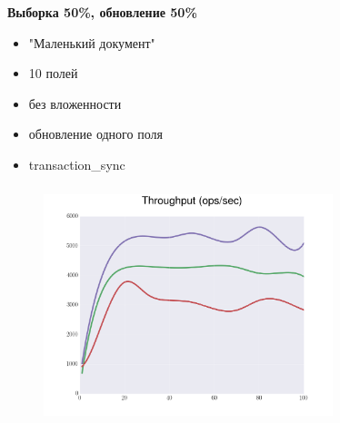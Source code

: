 \documentclass[18pt, compress, aspectratio=169]{beamer}
\begin{document}
\begin{frame}
    \frametitle{}
    \begin{center}
        \textbf{Выборка 50\%, обновление 50\%}
        \begin{itemize}[label={}]
            \item "Маленький документ"
            \item 10 полей
            \item без вложенности
            \item обновление одного поля
            \item transaction\_sync
        \end{itemize}
    \end{center}
\end{frame}

\begin{frame}
    \frametitle{}
    \begin{center}
    \begin{figure}
        \includegraphics[width=0.75\textwidth,center]{benchmarks/workload_a_mongo_config/throughput.png}
    \end{figure}
    \end{center}
\end{frame}
\end{document}
